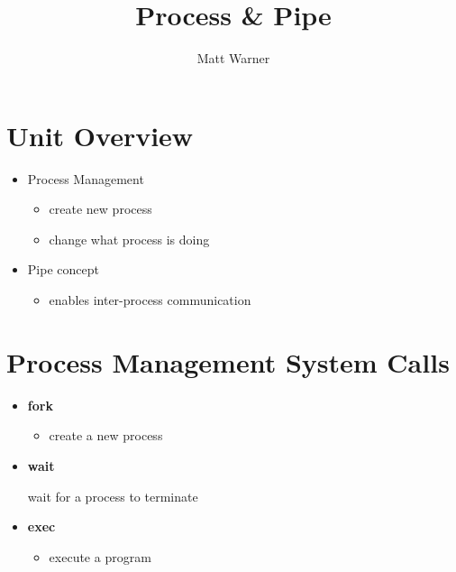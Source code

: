 \documentclass{report}
\title{\Huge{Process \& Pipe}}
\author{\huge{Matt Warner}}
\date{\huge{}}
\begin{document}
  \maketitle
\section{Unit Overview}
\begin{itemize}
  \item Process Management
    \begin{itemize}[label=$\circ$]
      \item create new process
      \item change what process is doing
    \end{itemize}
  \item Pipe concept
    \begin{itemize}[label=$\circ$]
      \item enables inter-process communication
    \end{itemize}
\end{itemize}
\section{Process Management System Calls}
\begin{itemize}
  \item \textbf{fork}
    \begin{itemize}[label=$\circ$]
      \item create a new process
    \end{itemize}
  \item \textbf{wait}
    \begin{itemize}[label=$\circ$]
    wait for a process to terminate
    \end{itemize}
    \item \textbf{exec}
      \begin{itemize}[label=$\circ$]
        \item execute a program
      \end{itemize}
\end{itemize}
\end{document}
